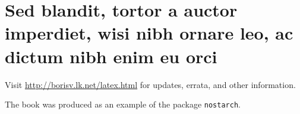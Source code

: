 \documentclass[cfonts,nofontsdir]{nostarch}
\begin{document}
\lipsum[43-48]

\section{Sed blandit, tortor a auctor imperdiet, wisi nibh ornare leo,
  ac dictum nibh enim eu orci}

\lipsum[94-98]

\backmatter

\nocite{*}



\printindex

\updatespage

Visit \url{http://borisv.lk.net/latex.html} for updates, errata, and
other information.


\colophon

The book was produced as an example of the package \texttt{nostarch}. 
\end{document}

